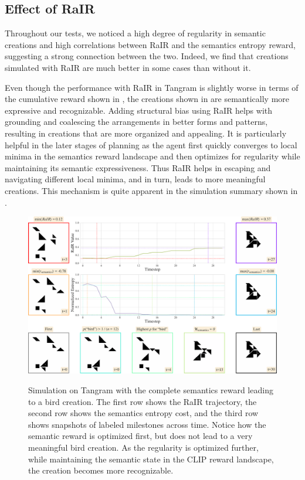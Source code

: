 \newpage
\subsection{Effect of RaIR}
\label{sec:effect-rair}

Throughout our tests, we noticed a high degree of regularity in semantic creations and high correlations between RaIR and the semantics entropy reward, suggesting a strong connection between the two.
Indeed, we find that creations simulated with RaIR are much better in some cases than without it.

Even though the performance with RaIR in Tangram is slightly worse in terms of the cumulative reward shown in , the creations shown in  are semantically more expressive and recognizable.
Adding structural bias using RaIR helps with grounding and coalescing the arrangements in better forms and patterns, resulting in creations that are more organized and appealing.
It is particularly helpful in the later stages of planning as the agent first quickly converges to local minima in the semantics reward landscape and then optimizes for regularity while maintaining its semantic expressiveness.
Thus RaIR helps in escaping and navigating different local minima, and in turn, leads to more meaningful creations.
This mechanism is quite apparent in the simulation summary shown in .

\begin{figure}[h]
    \centering
    \href{https://drive.google.com/file/d/1zhw-571KImEE4OPbpeWEA9SAKPv4r7F3}{\includegraphics[width=\textwidth]{images/sim_rair_later_bird_cropped.pdf}}
    \caption[Simulation on Tangram with the complete semantics reward leading to a bird creation.]{Simulation on Tangram with the complete semantics reward leading to a bird creation. The first row shows the RaIR trajectory, the second row shows the semantics entropy cost, and the third row shows snapshots of labeled milestones across time. Notice how the semantic reward is optimized first, but does not lead to a very meaningful bird creation. As the regularity is optimized further, while maintaining the semantic state in the CLIP reward landscape, the creation becomes more recognizable.}
    \label{fig:sim}
\end{figure}

